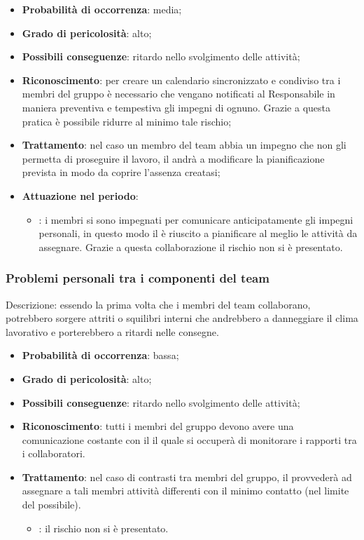 \documentclass[PianoDiProgetto.tex]{subfiles}
\begin{document}
	\begin{itemize}
		\item \textbf{Probabilità di occorrenza}: media;
		\item \textbf{Grado di pericolosità}: alto;
		\item \textbf{Possibili conseguenze}: ritardo nello svolgimento delle attività;
		\item \textbf{Riconoscimento}: per creare un calendario sincronizzato e condiviso tra i membri del gruppo è necessario che vengano notificati al Responsabile in maniera preventiva e tempestiva gli impegni di ognuno. Grazie a questa pratica è possibile ridurre al minimo tale rischio;
		\item \textbf{Trattamento}: nel caso un membro del team abbia un impegno che non gli permetta di proseguire il lavoro, il \RESP{} andrà a modificare la pianificazione prevista in modo da coprire l'assenza creatasi;
		\item \textbf{Attuazione nel periodo}: 
			\begin{itemize}
				\item \ARdoc : i membri si sono impegnati per comunicare anticipatamente gli impegni personali, in questo modo il \RESP{} è riuscito a pianificare al meglio le attività da assegnare. Grazie a questa collaborazione il rischio non si è presentato.
			\end{itemize}
	\end{itemize}
		\subsubsection{Problemi personali tra i componenti del team}
			\label{sec:pptc}
Descrizione: essendo la prima volta che i membri del team collaborano, potrebbero sorgere attriti o squilibri interni che andrebbero a danneggiare il clima lavorativo e porterebbero a ritardi nelle consegne.

	\begin{itemize}
		\item \textbf{Probabilità di occorrenza}: bassa;
		\item \textbf{Grado di pericolosità}: alto;
		\item \textbf{Possibili conseguenze}: ritardo nello svolgimento delle attività;
		\item \textbf{Riconoscimento}: tutti i membri del gruppo devono avere una comunicazione costante con il \RESP{} il quale si occuperà di monitorare i rapporti tra i collaboratori.
		\item \textbf{Trattamento}: nel caso di contrasti tra membri del gruppo, il \RESP{} provvederà ad assegnare a tali membri attività differenti con il minimo contatto (nel limite del possibile).
		\begin{itemize}
				\item \ARdoc : il rischio non si è presentato.
		\end{itemize}
	\end{itemize}
	
\end{document}
